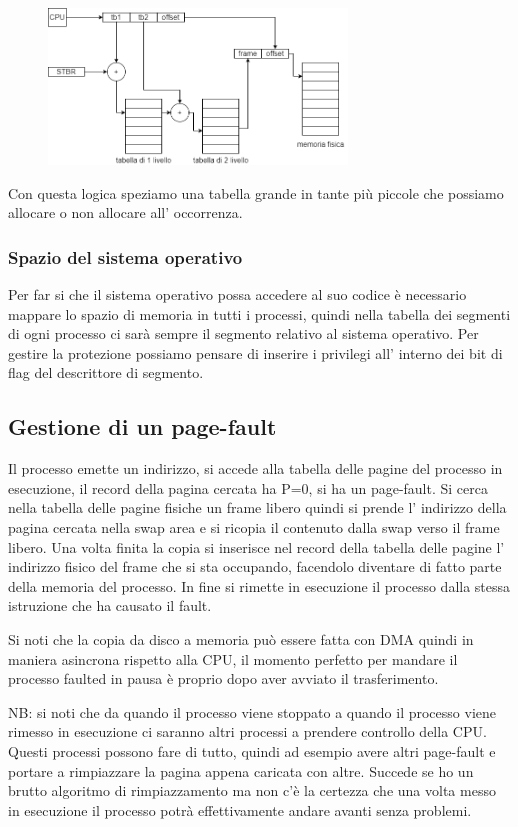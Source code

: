 \begin{figure}[H]
    \centering
    \includegraphics[width=300px]{images/9_Gestione_della_memoria/paginazione_due_livelli.png}
\end{figure}

Con questa logica speziamo una tabella grande in tante più piccole che possiamo allocare o non allocare all' occorrenza.


\subsubsection{Spazio del sistema operativo}
Per far si che il sistema operativo possa accedere al suo codice è necessario mappare lo spazio di memoria in tutti i processi, quindi nella tabella dei segmenti di ogni processo ci sarà sempre il segmento relativo al sistema operativo.
Per gestire la protezione possiamo pensare di inserire i privilegi all' interno dei bit di flag del descrittore di segmento.


\subsection{Gestione di un page-fault}
Il processo emette un indirizzo, si accede alla tabella delle pagine del processo in esecuzione, il record della pagina cercata ha P=0, si ha un page-fault.
Si cerca nella tabella delle pagine fisiche un frame libero quindi si prende l' indirizzo della pagina cercata nella swap area e si ricopia il contenuto dalla swap verso il frame libero.
Una volta finita la copia si inserisce nel record della tabella delle pagine l' indirizzo fisico del frame che si sta occupando, facendolo diventare di fatto parte della memoria del processo.
In fine si rimette in esecuzione il processo dalla stessa istruzione che ha causato il fault.

Si noti che la copia da disco a memoria può essere fatta con DMA quindi in maniera asincrona rispetto alla CPU, il momento perfetto per mandare il processo faulted in pausa è proprio dopo aver avviato il trasferimento.

NB: si noti che da quando il processo viene stoppato a quando il processo viene rimesso in esecuzione ci saranno altri processi a prendere controllo della CPU.
Questi processi possono fare di tutto, quindi ad esempio avere altri page-fault e portare a rimpiazzare la pagina appena caricata con altre.
Succede se ho un brutto algoritmo di rimpiazzamento ma non c'è la certezza che una volta messo in esecuzione il processo potrà effettivamente andare avanti senza problemi.

